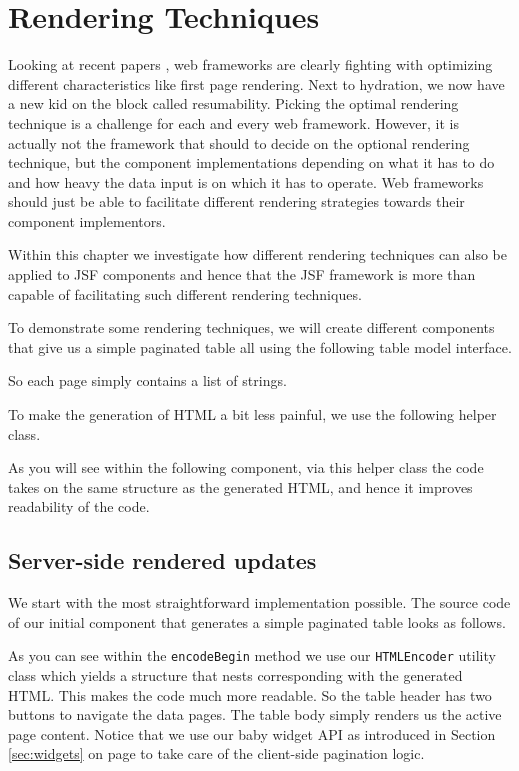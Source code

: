 %

\chapter{Rendering Techniques}

Looking at recent papers \cite{Resumability2024},  web frameworks are clearly fighting with optimizing different characteristics like first page rendering.
Next to hydration, we now have a new kid on the block called resumability.
Picking the optimal rendering technique is a challenge for each and every web framework.
However, it is actually not the framework that should to decide on the optional rendering technique, but the component implementations depending on what it has to do and how heavy the data input is on which it has to operate.
Web frameworks should just be able to facilitate different rendering strategies towards their component implementors.

Within this chapter we investigate how different rendering techniques can also be applied to JSF components and hence that the JSF framework is more than capable of facilitating such different rendering techniques.

To demonstrate some rendering techniques, we will create different components that give us a simple paginated table all using the following table model interface.

So each page simply contains a list of strings.

To make the generation of HTML a bit less painful, we use the following helper class.

As you will see within the following component, via this helper class the code takes on the same structure as the generated HTML, and hence it improves readability of the code.

\section{Server-side rendered updates}
We start with the most straightforward implementation possible.
The source code of our initial component that generates a simple paginated table looks as follows.

As you can see within the \texttt{encodeBegin} method we use our \texttt{HTMLEncoder} utility class which yields a structure that nests corresponding with the generated HTML.
This makes the code much more readable.
So the table header has two buttons to navigate the data pages.
The table body simply renders us the active page content.
Notice that we use our baby widget API as introduced in Section \ref{sec:widgets} on page \pageref{sec:widgets} to take care of the client-side pagination logic.

